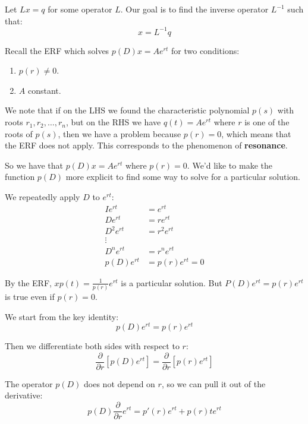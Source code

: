 Let $Lx = q$ for some operator $L$. Our goal is to find the inverse operator $L^{-1}$ such that:
\begin{equation*}
x = L^{-1} q
\end{equation*}

Recall the ERF which solves $p(D) x = A e^{r t}$ for two conditions:
\begin{enumerate}
    \item $p(r) \neq 0$.
    \item $A$ constant.
\end{enumerate}

We note that if on the LHS we found the characteristic polynomial $p(s)$ with roots $r_1, r_2, \ldots, r_n$, but on the RHS we have $q(t) = A e^{r t}$ where $r$ is one of the roots of $p(s)$, then we have a problem because $p(r) = 0$, which means that the ERF does not apply. This corresponds to the phenomenon of \textbf{resonance}.

So we have that $p(D)x = A e^{rt}$ where $p(r) = 0$. We'd like to make the function $p(D)$ more explicit to find some way to solve for a particular solution.

We repeatedly apply $D$ to $e^{rt}$:
\begin{align*}
I e^{rt} &= e^{rt} \\
D e^{rt} &= r e^{rt} \\
D^2 e^{rt} &= r^2 e^{rt} \\
\vdots \\
D^n e^{rt} &= r^n e^{rt} \\
p(D) e^{rt} &= p(r) e^{rt} = 0
\end{align*}

By the ERF, $x p(t) = \frac{1}{p(r)} e^{rt}$ is a particular solution. But $P(D) e^{rt} = p(r) e^{rt}$ is true even if $p(r) = 0$.

We start from the key identity:
\begin{equation*}
p(D) e^{rt} = p(r) e^{rt}
\end{equation*}

Then we differentiate both sides with respect to $r$:
\begin{equation*}
\frac{\partial}{\partial r} \left[ p(D) e^{rt} \right] = \frac{\partial}{\partial r} \left[ p(r) e^{rt} \right]
\end{equation*}

The operator $p(D)$ does not depend on $r$, so we can pull it out of the derivative:
\begin{equation*}
p(D) \frac{\partial}{\partial r} e^{rt} = p'(r) e^{rt} + p(r) t e^{rt}
\end{equation*}

